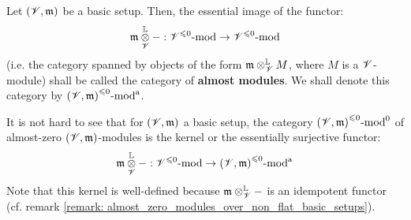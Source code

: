                 \begin{definition} \label{def: almost_modules}
                    Let $(\mathscr{V}, \mathfrak{m})$ be a basic setup. Then, the essential image of the functor:
                        $$\m \tensor_{\scrV}^{\L} -: {\scrV}^{\leq 0}\mod \to {\scrV}^{\leq 0}\mod$$
                    (i.e. the category spanned by objects of the form $\m \tensor_{\scrV}^{\L} M$, where $M$ is a $\mathscr{V}$-module) shall be called the category of \textbf{almost modules}. We shall denote this category by ${(\mathscr{V}, \mathfrak{m})}^{\leqslant 0}\text{-}\mathrm{mod}^{\mathrm{a}}$.
                \end{definition}
                \begin{remark} \label{remark: categories_of_almost_zero_modules_are_kernels}
                    It is not hard to see that for $(\mathscr{V}, \mathfrak{m})$ a basic setup, the category ${(\mathscr{V}, \mathfrak{m})}^{\leqslant 0}\text{-}\mathrm{mod}^0$ of almost-zero $(\mathscr{V}, \mathfrak{m})$-modules is the kernel or the essentially surjective functor:
                        $$\m \tensor_{\scrV}^{\L} -: {\scrV}^{\leq 0}\mod \to {(\scrV, \m)}^{\leq 0}\mod^{\almost}$$
                    Note that this kernel is well-defined because $\m \tensor_{\scrV}^{\L} -$ is an idempotent functor (cf. remark \ref{remark: almost_zero_modules_over_non_flat_basic_setups}).
                \end{remark}
                
